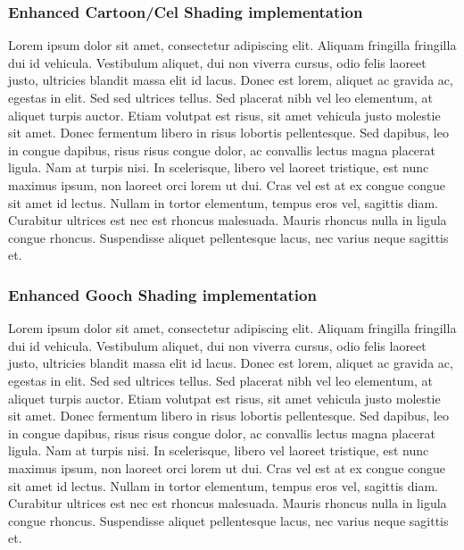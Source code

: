 \subsubsection{Enhanced Cartoon/Cel Shading implementation}
Lorem ipsum dolor sit amet, consectetur adipiscing elit. Aliquam fringilla fringilla dui id vehicula. Vestibulum aliquet, dui non viverra cursus, odio felis laoreet justo, ultricies blandit massa elit id lacus. Donec est lorem, aliquet ac gravida ac, egestas in elit. Sed sed ultrices tellus. Sed placerat nibh vel leo elementum, at aliquet turpis auctor. Etiam volutpat est risus, sit amet vehicula justo molestie sit amet. Donec fermentum libero in risus lobortis pellentesque. Sed dapibus, leo in congue dapibus, risus risus congue dolor, ac convallis lectus magna placerat ligula. Nam at turpis nisi. In scelerisque, libero vel laoreet tristique, est nunc maximus ipsum, non laoreet orci lorem ut dui. Cras vel est at ex congue congue sit amet id lectus. Nullam in tortor elementum, tempus eros vel, sagittis diam. Curabitur ultrices est nec est rhoncus malesuada. Mauris rhoncus nulla in ligula congue rhoncus. Suspendisse aliquet pellentesque lacus, nec varius neque sagittis et.
\subsubsection{Enhanced Gooch Shading implementation}
Lorem ipsum dolor sit amet, consectetur adipiscing elit. Aliquam fringilla fringilla dui id vehicula. Vestibulum aliquet, dui non viverra cursus, odio felis laoreet justo, ultricies blandit massa elit id lacus. Donec est lorem, aliquet ac gravida ac, egestas in elit. Sed sed ultrices tellus. Sed placerat nibh vel leo elementum, at aliquet turpis auctor. Etiam volutpat est risus, sit amet vehicula justo molestie sit amet. Donec fermentum libero in risus lobortis pellentesque. Sed dapibus, leo in congue dapibus, risus risus congue dolor, ac convallis lectus magna placerat ligula. Nam at turpis nisi. In scelerisque, libero vel laoreet tristique, est nunc maximus ipsum, non laoreet orci lorem ut dui. Cras vel est at ex congue congue sit amet id lectus. Nullam in tortor elementum, tempus eros vel, sagittis diam. Curabitur ultrices est nec est rhoncus malesuada. Mauris rhoncus nulla in ligula congue rhoncus. Suspendisse aliquet pellentesque lacus, nec varius neque sagittis et.